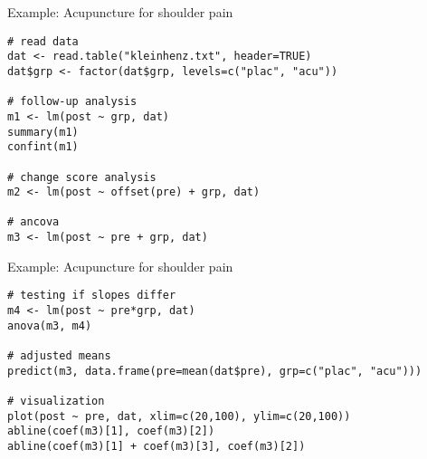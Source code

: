 \documentclass[aspectratio=169]{beamer}
\begin{document}
{

\begin{frame}[fragile]{Example: Acupuncture for shoulder pain}
\begin{lstlisting}
# read data
dat <- read.table("kleinhenz.txt", header=TRUE)
dat$grp <- factor(dat$grp, levels=c("plac", "acu"))

# follow-up analysis
m1 <- lm(post ~ grp, dat)
summary(m1)
confint(m1)

# change score analysis
m2 <- lm(post ~ offset(pre) + grp, dat)

# ancova
m3 <- lm(post ~ pre + grp, dat)
\end{lstlisting}
\end{frame}

\begin{frame}[fragile]{Example: Acupuncture for shoulder pain}
\begin{lstlisting}
# testing if slopes differ
m4 <- lm(post ~ pre*grp, dat)
anova(m3, m4)

# adjusted means
predict(m3, data.frame(pre=mean(dat$pre), grp=c("plac", "acu")))

# visualization
plot(post ~ pre, dat, xlim=c(20,100), ylim=c(20,100))
abline(coef(m3)[1], coef(m3)[2])
abline(coef(m3)[1] + coef(m3)[3], coef(m3)[2])
\end{lstlisting}
\end{frame}


}
\end{document}
